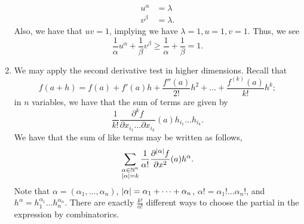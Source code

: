 \begin{enumerate}[label=(\alph*)]
\begin{align*}
        u^\alpha &= \lambda \\
        v^\beta &= \lambda.
    \end{align*}
    Also, we have that $uv = 1$, implying we have $\lambda = 1, u = 1, v = 1$. Thus, we see
    \[ \frac{1}{\alpha} u^\alpha + \frac{1}{\beta} v^\beta \geq \frac{1}{\alpha} + \frac{1}{\beta} = 1. \]
    \item We may apply the second derivative test in higher dimensions. Recall that
    \[ f(a + h) = f(a) + f'(a)h + \frac{f''(a)}{2!} h^2 + \dots + \frac{f^{(k)}(a)}{k!} h^k; \]
    in $n$ variables, we have that the sum of terms are given by
    \[ \frac{1}{k!} \frac{\partial^k f}{\partial x_{i_1} \dots \partial x_{i_k}} (a) h_{i_1} \dots h_{i_k}. \]
    We have that the sum of like terms may be written as follows,
    \[ \sum_{\substack{\alpha \in \mathbb N^n \\ \left\lvert \alpha \right\rvert = k}} \frac{1}{\alpha!} \frac{\partial^{\left\lvert \alpha \right\rvert} f}{\partial x^2} (a) h^\alpha. \]
    Note that $\alpha = (\alpha_1, \dots, \alpha_n)$, $\left\lvert \alpha \right\rvert = \alpha_1 + \dots + \alpha_n$, $\alpha! = \alpha_1! \dots \alpha_n!$, and $h^\alpha = h_1^{\alpha_1} \dots h_n^{\alpha_n}$. There are exactly $\frac{k!}{\alpha!}$ different ways to choose the partial in the expression by combinatorics.
\end{enumerate}